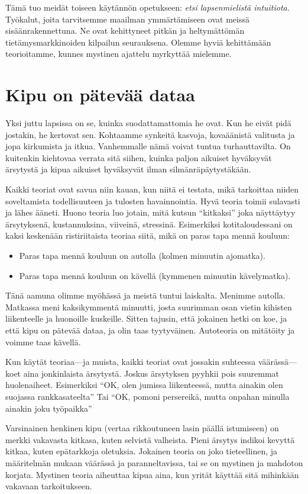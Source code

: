Tämä tuo meidät toiseen käytännön opetukseen: \emph{etsi lapsenmielistä intuitiota.} Työkalut, joita tarvitsemme maailman ymmärtämiseen ovat meissä sisäänrakennettuna. Ne ovat kehittyneet pitkän ja heltymättömän tietämysmarkkinoiden kilpailun seurauksena. Olemme hyviä kehittämään teorioitamme, kunnes mystinen ajattelu myrkyttää mielemme.

\section{Kipu on pätevää dataa}

Yksi juttu lapsissa on se, kuinka suodattamattomia he ovat. Kun he eivät pidä jostakin, he kertovat sen. Kohtaamme synkeitä kasvoja, kovaäänistä valitusta ja jopa kirkumista ja itkua. Vanhemmalle nämä voivat tuntua turhauttavilta. On kuitenkin kiehtovaa verrata sitä siihen, kuinka paljon aikuiset hyväksyvät ärsytystä ja kipua aikuiset hyväksyvät ilman silmänräpäytystäkään.

Kaikki teoriat ovat savua niin kauan, kun niitä ei testata, mikä tarkoittaa niiden soveltamista todellisuuteen ja tulosten havainnointia. Hyvä teoria toimii sulavasti ja lähes ääneti. Huono teoria luo jotain, mitä kutsun ``kitkaksi\vmq{,}'' joka näyttäytyy ärsytyksenä, kustannuksina, viiveinä, stressinä. Esimerkiksi kotitaloudessani on kaksi keskenään ristiriitaista teoriaa siitä, mikä on paras tapa mennä kouluun:
\begin{itemize}
\item Paras tapa mennä kouluun on autolla (kolmen minuutin ajomatka).
\item Paras tapa mennä kouluun on kävellä (kymmenen minuutin kävelymatka).
\end{itemize}
Tänä aamuna olimme myöhässä ja meistä tuntui laiskalta. Menimme autolla. Matkassa meni kaksikymmentä minuutti, josta suurimman osan vietin kihisten liikenteelle ja huonoille kuskeille. Sitten tajusin, että jokainen hetki on koe, ja että kipu on pätevää dataa, ja olin taas tyytyväinen. Autoteoria on mitätöity ja voimme taas kävellä.

Kun käytät teoriaa---ja muista, kaikki teoriat ovat jossakin suhteessa väärässä---koet aina jonkinlaista ärsytystä. Joskus ärsytyksen pyyhkii pois suuremmat huolenaiheet. Esimerkiksi ``OK, olen jumissa liikenteessä, mutta ainakin olen suojassa rankkasateelta'' Tai ``OK, pomoni persereikä, mutta onpahan minulla ainakin joku työpaikka''

Varsinainen henkinen kipu (vertaa rikkoutuneen lasin päällä istumiseen) on merkki vakavasta kitkasa, kuten selvistä valheista. Pieni ärsytys indikoi kevyttä kitkaa, kuten epätarkkoja oletuksia. Jokainen teoria on joko tieteellinen, ja määritelmän mukaan väärässä ja paranneltavissa, tai se on mystinen ja mahdoton korjata. Mystinen teoria aiheuttaa kipua aina, kun yrität käyttää sitä mihinkään vakavaan tarkoitukseen.


